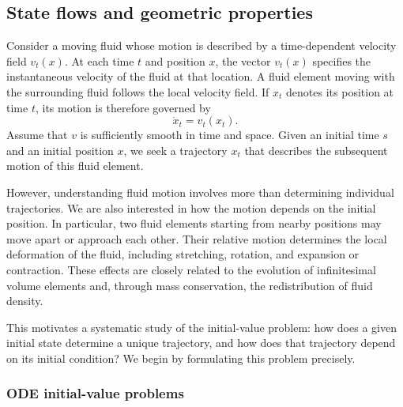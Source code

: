 \documentclass[12pt,a4paper,oneside]{book}
\begin{document}
\subsection{State flows and geometric properties}

Consider a moving fluid whose motion is described by a time-dependent velocity field $v_t(x)$. At each time $t$ and position
$x$, the vector $v_t(x)$ specifies the instantaneous velocity of the fluid at that location. A fluid element moving with
the surrounding fluid follows the local velocity field. If $x_t$ denotes its position at time $t$, its motion is therefore
governed by
\begin{equation*}
    \dot x_t=v_t(x_t).
\end{equation*}
Assume that $v$ is sufficiently smooth in time and space. Given an initial time $s$ and an initial position $x$, we seek
a trajectory $x_t$ that describes the subsequent motion of this fluid element.

However, understanding fluid motion involves more than determining individual trajectories. We are also interested in how
the motion depends on the initial position. In particular, two fluid elements starting from nearby positions may move apart
or approach each other. Their relative motion determines the local deformation of the fluid, including stretching, rotation,
and expansion or contraction. These effects are closely related to the evolution of infinitesimal volume elements and,
through mass conservation, the redistribution of fluid density.

This motivates a systematic study of the initial-value problem: how does a given initial state determine a unique trajectory,
and how does that trajectory depend on its initial condition? We begin by formulating this problem precisely.

\subsubsection{ODE initial-value problems}
\label{subsubsec:ode-model}
\end{document}

